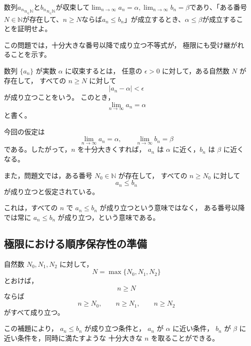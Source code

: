 \begin{exercise}
	数列${a_n}_{n_\in\mathbb{N}}$と${b_n}_{n_\in\mathbb{N}}$が収束して$\lim_{n\rightarrow\infty}a_n=\alpha,\lim_{n\rightarrow\infty}b_n=\beta$であり、「ある番号$N\in\mathbb{N}$が存在して、$n\geq N$ならば$a_n\leq b_n$」が成立するとき、$\alpha\leq\beta$が成立することを証明せよ。
\end{exercise}
\begin{background}
	この問題では，十分大きな番号以降で成り立つ不等式が，
	極限にも受け継がれることを示す。
	
	\begin{definition}[数列の収束]
		数列 $\{a_n\}$ が実数 $\alpha$ に収束するとは，
		任意の $\epsilon>0$ に対して，ある自然数 $N$ が存在して，
		すべての $n\geq N$ に対して
		\[
		|a_n-\alpha|<\epsilon
		\]
		が成り立つことをいう。
		このとき，
		\[
		\lim_{n\to\infty}a_n=\alpha
		\]
		と書く。
	\end{definition}
	
	\begin{remark}
		今回の仮定は
		\[
		\lim_{n\to\infty}a_n=\alpha,
		\qquad
		\lim_{n\to\infty}b_n=\beta
		\]
		である。したがって，$n$ を十分大きくすれば，
		$a_n$ は $\alpha$ に近く，$b_n$ は $\beta$ に近くなる。
	\end{remark}
	
	\begin{remark}
		また，問題文では，ある番号 $N_0\in\mathbb{N}$ が存在して，
		すべての $n\geq N_0$ に対して
		\[
		a_n\leq b_n
		\]
		が成り立つと仮定されている。
		
		これは，すべての $n$ で $a_n\leq b_n$ が成り立つという意味ではなく，
		ある番号以降では常に $a_n\leq b_n$ が成り立つ，という意味である。
	\end{remark}
	
	\subsection{極限における順序保存性の準備}
	
	\begin{lemma}[有限個の自然数の最大値]
		自然数 $N_0,N_1,N_2$ に対して，
		\[
		N=\max\{N_0,N_1,N_2\}
		\]
		とおけば，
		\[
		n\geq N
		\]
		ならば
		\[
		n\geq N_0,\qquad n\geq N_1,\qquad n\geq N_2
		\]
		がすべて成り立つ。
	\end{lemma}
	
	\begin{remark}
		この補題により，
		$a_n\leq b_n$ が成り立つ条件と，
		$a_n$ が $\alpha$ に近い条件，
		$b_n$ が $\beta$ に近い条件を，同時に満たすような
		十分大きな $n$ を取ることができる。
	\end{remark}
\end{background}

